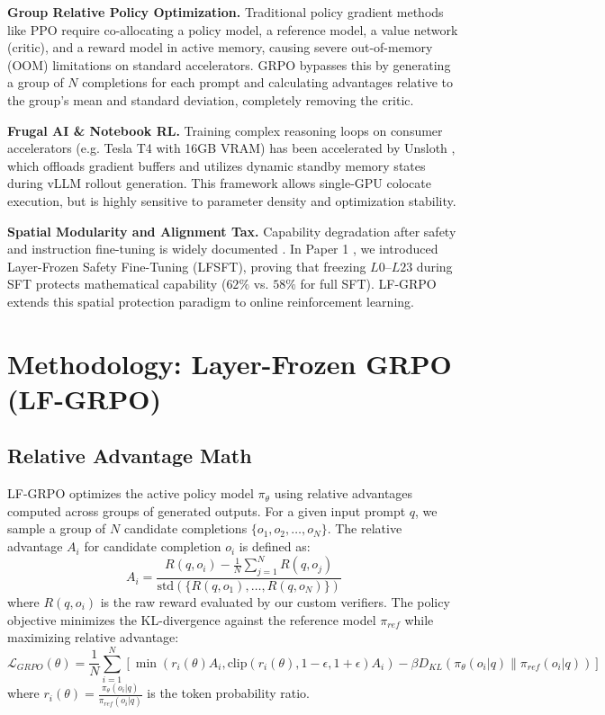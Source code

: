 \documentclass[11pt]{article}
\begin{document}
\textbf{Group Relative Policy Optimization.} Traditional policy gradient methods like PPO \cite{schulman2017proximal} require co-allocating a policy model, a reference model, a value network (critic), and a reward model in active memory, causing severe out-of-memory (OOM) limitations on standard accelerators. GRPO \cite{deepseek2025} bypasses this by generating a group of $N$ completions for each prompt and calculating advantages relative to the group's mean and standard deviation, completely removing the critic.

\textbf{Frugal AI \& Notebook RL.} Training complex reasoning loops on consumer accelerators (e.g. Tesla T4 with 16GB VRAM) has been accelerated by Unsloth \cite{unsloth2026}, which offloads gradient buffers and utilizes dynamic standby memory states during vLLM rollout generation. This framework allows single-GPU colocate execution, but is highly sensitive to parameter density and optimization stability.

\textbf{Spatial Modularity and Alignment Tax.} Capability degradation after safety and instruction fine-tuning is widely documented \cite{ouyang2022training}. In Paper 1 \cite{dave2026safety}, we introduced Layer-Frozen Safety Fine-Tuning (LFSFT), proving that freezing $L0$--$L23$ during SFT protects mathematical capability ($62\%$ vs. $58\%$ for full SFT). LF-GRPO extends this spatial protection paradigm to online reinforcement learning.

\section{Methodology: Layer-Frozen GRPO (LF-GRPO)}

\subsection{Relative Advantage Math}

LF-GRPO optimizes the active policy model $\pi_\theta$ using relative advantages computed across groups of generated outputs. For a given input prompt $q$, we sample a group of $N$ candidate completions $\{o_1, o_2, \dots, o_N\}$. The relative advantage $A_i$ for candidate completion $o_i$ is defined as:
\begin{equation}
A_i = \frac{R(q, o_i) - \frac{1}{N}\sum_{j=1}^N R(q, o_j)}{\text{std}\left(\{R(q, o_1), \dots, R(q, o_N)\}\right)}
\end{equation}
where $R(q, o_i)$ is the raw reward evaluated by our custom verifiers. The policy objective minimizes the KL-divergence against the reference model $\pi_{ref}$ while maximizing relative advantage:
\begin{equation}
\mathcal{L}_{GRPO}(\theta) = \frac{1}{N}\sum_{i=1}^N \left[ \min\left(r_i(\theta)A_i, \text{clip}(r_i(\theta), 1-\epsilon, 1+\epsilon)A_i\right) - \beta D_{KL}\left(\pi_\theta(o_i|q) \parallel \pi_{ref}(o_i|q)\right) \right]
\end{equation}
where $r_i(\theta) = \frac{\pi_\theta(o_i|q)}{\pi_{ref}(o_i|q)}$ is the token probability ratio.
\end{document}

